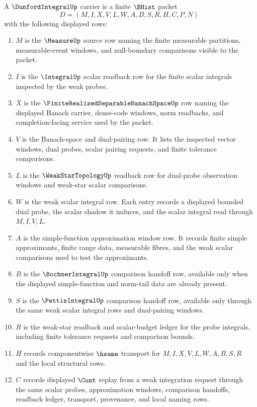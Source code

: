 \begin{definition}
\label{def:dunford-integral-carrier}
A $\DunfordIntegralUp$ carrier is a finite $\BHist$ packet
$$
D=(M,I,X,V,L,W,A,B,S,R,H,C,P,N)
$$
with the following displayed rows:
\begin{enumerate}
\item $M$ is the $\MeasureUp$ source row naming the finite measurable partitions, measurable-event windows, and null-boundary comparisons visible to the packet.
\item $I$ is the $\IntegralUp$ scalar readback row for the finite scalar integrals inspected by the weak probes.
\item $X$ is the $\FiniteRealizedSeparableBanachSpaceUp$ row naming the displayed Banach carrier, dense-code windows, norm readbacks, and completion-facing service used by the packet.
\item $V$ is the Banach-space and dual-pairing row. It lists the inspected vector windows, dual probes, scalar pairing requests, and finite tolerance comparisons.
\item $L$ is the $\WeakStarTopologyUp$ readback row for dual-probe observation windows and weak-star scalar comparisons.
\item $W$ is the weak scalar integral row. Each entry records a displayed bounded dual probe, the scalar shadow it induces, and the scalar integral read through $M,I,V,L$.
\item $A$ is the simple-function approximation window row. It records finite simple approximants, finite range data, measurable fibres, and the weak scalar comparisons used to test the approximants.
\item $B$ is the $\BochnerIntegralUp$ comparison handoff row, available only when the displayed simple-function and norm-tail data are already present.
\item $S$ is the $\PettisIntegralUp$ comparison handoff row, available only through the same weak scalar integral rows and dual-pairing windows.
\item $R$ is the weak-star readback and scalar-budget ledger for the probe integrals, including finite tolerance requests and comparison bounds.
\item $H$ records componentwise $\hsame$ transport for $M,I,X,V,L,W,A,B,S,R$ and the local structural rows.
\item $C$ records displayed $\Cont$ replay from a weak integration request through the same scalar probes, approximation windows, comparison handoffs, readback ledger, transport, provenance, and local naming rows.

\end{enumerate}
\end{definition}
